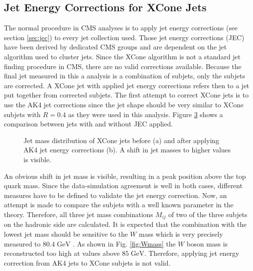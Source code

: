 \subsection{Jet Energy Corrections for XCone Jets} 
	The normal procedure in CMS analyses is to apply jet energy corrections (see section \ref{sec:jec}) to every jet collection used. Those jet energy corrections (JEC) have been derived by dedicated CMS groups and are dependent on the jet algorithm used to cluster jets. Since the XCone algorithm is not a standard jet finding procedure in CMS, there are no valid corrections available. Because the final jet measured in this a analysis is a combination of subjets, only the subjets are corrected. A XCone jet with applied jet energy corrections refers then to a jet put together from corrected subjets. The first attempt to correct XCone jets is to use the AK4 jet corrections since the jet shape should be very similar to XCone subjets with $R=0.4$ as they were used in this analysis. Figure \ref{fig:MJet_jec} shows a comparison between jets with and without JEC applied. 
 	\begin{figure}[tb]
 		\begin{subfigure}{.5\textwidth}
 		\centering
 		\caption{}
 		\label{fig:MJet_jec1}
 		\end{subfigure}
 		\begin{subfigure}{.5\textwidth}
 		\centering
 		\caption{}
 		\label{fig:MJet_jec2}
 		\end{subfigure}
 		\caption{Jet mass distribution of XCone jets before (a) and after applying AK4 jet energy corrections (b). A shift in jet masses to higher values is visible.}
 		\label{fig:MJet_jec}
 	\end{figure}	
 	An obvious shift in jet mass is visible, resulting in a peak position above the top quark mass. Since the data-simulation agreement is well in both cases, different measures have to be defined to validate the jet energy correction. Now, an attempt is made to compare the subjets with a well known parameter in the theory. Therefore, all three jet mass combinations $M_{ij}$ of two of the three subjets on the hadronic side are calculated. It is expected that the combination with the lowest jet mass should be sensitive to the $W$ mass which is very precisely measured to $80.4\;\text{GeV}$ \cite{Wmass}. As shown in Fig. \ref{fig:Wmass} the $W$ boson mass is reconstructed too high at values above $85\;\text{GeV}$. Therefore, applying jet energy correction from AK4 jets to XCone subjets is not valid.
